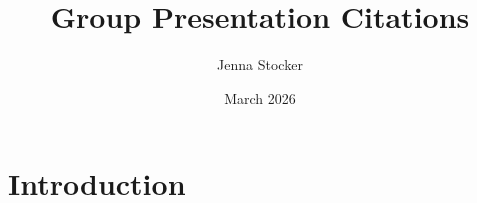 \documentclass{article}
\title{Group Presentation Citations}
\author{Jenna Stocker}
\date{March 2026}
\begin{document}
\maketitle

\section{Introduction}
\end{document}
